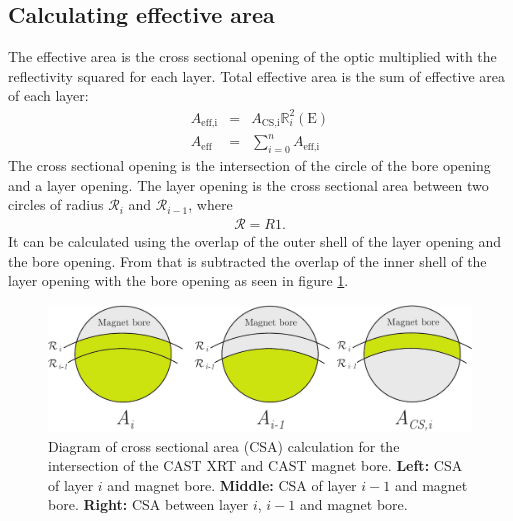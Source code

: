 \subsection{Calculating effective area}\label{sec:eff_area}
The effective area is the cross sectional opening of the optic multiplied with the reflectivity squared for each layer. Total effective area is the sum of effective area of each layer:
\begin{eqnarray}
  A_{\text{eff,i}} &=& A_{\text{CS,i}}\mathbb{R}_i^2(\text{E})\\
  A_{\text{eff}} &=& \sum_{i=0}^n A_{\text{eff,i}}
\end{eqnarray}
The cross sectional opening is the intersection of the circle of the bore opening and a layer opening. The layer opening is the cross sectional area between two circles of radius $\mathcal{R}_{i}$ and $\mathcal{R}_{i-1}$, where
\begin{eqnarray}
  \mathcal{R} = \mathit{R1}.
\end{eqnarray}
It can be calculated using the overlap of the outer shell of the layer opening and the bore opening. From that is subtracted the overlap of the inner shell of the layer opening with the bore opening as seen in figure \ref{fig:cross_section_area}.

\begin{figure}[htbp]
  \centering
    \includegraphics[width=0.9\linewidth]{figures/cast/cross_section_area.pdf}
  \caption{\footnotesize Diagram of cross sectional area (CSA) calculation for the intersection of the CAST XRT and CAST magnet bore. \textbf{Left:} CSA of layer $i$ and magnet bore. \textbf{Middle:} CSA of layer $i-1$ and magnet bore. \textbf{Right:} CSA between layer $i$, $i-1$ and magnet bore.}
  \label{fig:cross_section_area}
\end{figure}

